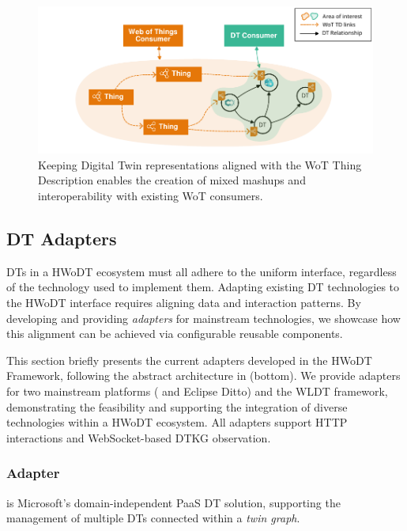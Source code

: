 \begin{figure}[t]
  \centering
  \includegraphics[width=\columnwidth]{figures/hwodt/wot-dt-mashups.pdf}
  \caption{Keeping Digital Twin representations aligned with the \ac{WoT} Thing Description enables the creation of mixed mashups and interoperability with existing \ac{WoT} consumers.}
  \label{fig:wot-dt-mashups}
\end{figure}


\subsection{\acs{DT} Adapters}
\label{ssec:adapters}

\acp{DT} in a \ac{HWoDT} ecosystem must all adhere to the uniform interface, regardless of the technology used to implement them.
%
Adapting existing \ac{DT} technologies to the \ac{HWoDT} interface requires aligning data and interaction patterns.
%
By developing and providing \emph{adapters} for mainstream technologies, we showcase how this alignment can be achieved via configurable reusable components.

This section briefly presents the current adapters developed in the \ac{HWoDT} Framework, following the abstract architecture in  (bottom). 
%
We provide adapters for two mainstream platforms (\azureTwin{} and Eclipse Ditto) and the \acl{WLDT} framework, demonstrating the feasibility and supporting the integration of diverse technologies within a \ac{HWoDT} ecosystem.
All adapters support HTTP interactions and WebSocket-based \ac{DTKG} observation.

\subsubsection{\azureTwin{} Adapter}

\azureTwin{} is Microsoft's domain-independent \ac{PaaS} \ac{DT} solution, supporting the management of multiple \acp{DT} connected within a \emph{twin graph}.

